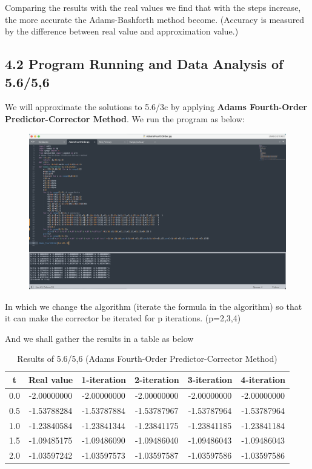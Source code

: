 \documentclass{article}
\begin{document}
    Comparing the results with the real values we find that with the steps increase, the more accurate the Adams-Bashforth method become. (Accuracy is measured by the difference between real value and approximation value.)

\subsection{4.2 Program Running and Data Analysis of 5.6/5,6 }
    We will approximate the solutions to 5.6/3c by applying \textbf{Adams Fourth-Order Predictor-Corrector Method}. We run the program as below:
    \begin{figure}[h]
    \centering
    \includegraphics[scale=0.2]{Program5}
    \end{figure}

    In which we change the algorithm (iterate the formula in the algorithm) so that it can make the corrector be iterated for p iterations. (p=2,3,4)

    And we shall gather the results in a table as below

    \begin{table}[htbp]
    \centering
    \caption{Results of 5.6/5,6 (Adams Fourth-Order Predictor-Corrector Method)}
    \begin{tabular}{c|c|c|c|c|c}
    \toprule
    t& \textbf{Real value} & \textbf{1-iteration} & \textbf{2-iteration} & \textbf{3-iteration} & \textbf{4-iteration}\\ 
    \midrule
    0.0 & -2.00000000 &-2.00000000 &-2.00000000 & -2.00000000 & -2.00000000\\
    0.5 & -1.53788284 &-1.53787884 &-1.53787967 & -1.53787964 & -1.53787964\\
    1.0 & -1.23840584 &-1.23841344 &-1.23841175 & -1.23841185 & -1.23841184\\
    1.5 & -1.09485175 &-1.09486090 &-1.09486040 & -1.09486043 & -1.09486043\\
    2.0 & -1.03597242 &-1.03597573 &-1.03597587 & -1.03597586 & -1.03597586\\
    \bottomrule
    \end{tabular}
    \end{table}
\end{document}
